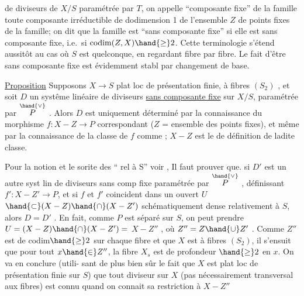 
de diviseurs de $X/S$ paramétrée par $T$, on appelle ``composante fixe'' de la
famille toute composante irréductible de dodimension 1 de l'ensemble $Z$ de
points fixes de la famille; on dit que la famille est ``sans composante
fixe'' si elle est sans composante fixe, i.e.\ si $\operatorname{codim}(Z,X) \hand{\geq} 2$. Cette
terminologie s'étend aussitôt au cas où $S$ est quelconque, en regardant
fibre par fibre. Le fait d'être sans composante fixe est évidemment stabl
par changement de base.

\uline{Proposition} \hand{/}Supposons $X \longrightarrow S$ plat loc de présentation finie, à fibres
$(S_2)$ , et soit $D$ un systême linéaire de diviseurs \uline{sans composante fixe}
sur $X/S$, paramétrée par $\overset{\hand{\vee}}{P}$ . Alors $D$ est uniquement déterminé par la
connaissance du morphisme $f: X - Z \longrightarrow P$ correspondant ($Z$ = ensemble
des points fixes), et même par la connaissance de la classe de $f$ comme
  ; $X-Z$ est le 
de définition de ladite classe.

Pour la notion et le sorite des ``
rel à S'' voir  ,  Il faut prouver que.
si  $D'$ est un
autre syst lin de diviseurs sans comp fixe paramétrée par $\overset{\hand{\vee}}{P}$ , 
définissant $f': X-Z' \longrightarrow P$, et si $f$ et $f'$ coincident dans un ouvert $U$
$\hand{\subset} (X-Z)\hand{\cap}(X-Z')$ schématiquement dense relativement à $S$, alors $D=D'$ .
En fait, comme $P$ est séparé sur $S$, on peut prendre $U=(X-Z)\hand{\cap}(X-Z') =$
 $X-Z''$ , où $Z'' = Z\hand{\cup}Z'$ . Comme $Z''$ est de codim$\hand{\geq}2$
sur chaque fibre et que $X$ est à fibres $(S_2)$, il s'ensuit que pour tout
$x\hand{\in} Z''$, la fibre $X_s$ est de profondeur $\hand{\geq}2$ en $x$. On va en conclure (utili-%
sant de plus bien sûr le fait que $X$ est plat loc de présentation finie
sur $S$) que tout diviseur  sur $X$ (pas nécessairement 
transversal aux fibres) est connu quand on connait sa restriction à $X-Z''$

